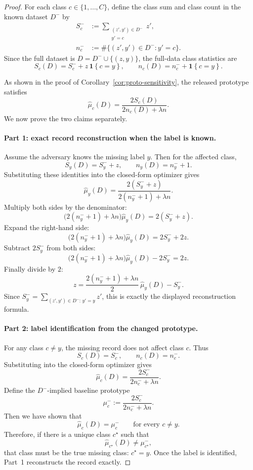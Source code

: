 \documentclass[conference,compsoc]{IEEEtran}
\newcommand{\ind}[1]{\mathbf{1}\!\left\{#1\right\}}
\begin{document}
\begin{proof}
For each class $c\in\{1,\dots,C\}$, define the class sum and class count in the known dataset $D^-$ by
\[
\begin{aligned}
S_c^-
&:= \sum_{\substack{(z',y')\in D^-\\ y'=c}} z',
\\
n_c^-
&:= \#\{(z',y')\in D^- : y'=c\}.
\end{aligned}
\]
Since the full dataset is $D=D^-\cup\{(z,y)\}$, the full-data class statistics are
\[
S_c(D)=S_c^-+z\,\ind{c=y},
\qquad
n_c(D)=n_c^-+\ind{c=y}.
\]

As shown in the proof of Corollary~\ref{cor:proto-sensitivity}, the released prototype satisfies
\[
\widehat\mu_c(D)=\frac{2S_c(D)}{2n_c(D)+\lambda n}.
\]
We now prove the two claims separately.

\paragraph{Part 1: exact record reconstruction when the label is known.}
Assume the adversary knows the missing label $y$. Then for the affected class,
\[
S_y(D)=S_y^-+z,
\qquad
n_y(D)=n_y^-+1.
\]
Substituting these identities into the closed-form optimizer gives
\[
\widehat\mu_y(D)=\frac{2(S_y^-+z)}{2(n_y^-+1)+\lambda n}.
\]
Multiply both sides by the denominator:
\[
\bigl(2(n_y^-+1)+\lambda n\bigr)\widehat\mu_y(D)=2(S_y^-+z).
\]
Expand the right-hand side:
\[
\bigl(2(n_y^-+1)+\lambda n\bigr)\widehat\mu_y(D)=2S_y^-+2z.
\]
Subtract $2S_y^-$ from both sides:
\[
\bigl(2(n_y^-+1)+\lambda n\bigr)\widehat\mu_y(D)-2S_y^-=2z.
\]
Finally divide by $2$:
\[
z=\frac{2(n_y^-+1)+\lambda n}{2}\,\widehat\mu_y(D)-S_y^-.
\]
Since $S_y^-=
\sum_{(z',y')\in D^-:\,y'=y} z'$, this is exactly the displayed reconstruction formula.

\paragraph{Part 2: label identification from the changed prototype.}
For any class $c\neq y$, the missing record does not affect class $c$. Thus
\[
S_c(D)=S_c^-,
\qquad
n_c(D)=n_c^-.
\]
Substituting into the closed-form optimizer gives
\[
\widehat\mu_c(D)=\frac{2S_c^-}{2n_c^-+\lambda n}.
\]
Define the $D^-$-implied baseline prototype
\[
\mu_c^-:=\frac{2S_c^-}{2n_c^-+\lambda n}.
\]
Then we have shown that
\[
\widehat\mu_c(D)=\mu_c^- \qquad \text{for every }c\neq y.
\]
Therefore, if there is a unique class $c^\star$ such that
\[
\widehat\mu_{c^\star}(D)\neq \mu_{c^\star}^-,
\]
that class must be the true missing class: $c^\star=y$. Once the label is identified, Part~1 reconstructs the record exactly.


\end{proof}
\end{document}
